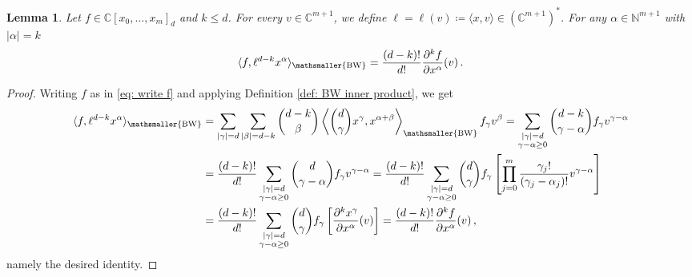 \documentclass[11pt,reqno]{amsart}
\numberwithin{equation}{section}
\theoremstyle{plain}
\numberwithin{theorem}{section}
\newtheorem{lemma}[theorem]{Lemma}
\theoremstyle{definition}
\newcommand{\N}{\mathbb{N}}
\newcommand{\C}{\mathbb{C}}
\newcommand{\mBW}{\mathsmaller{\mathrm{BW}}}
\begin{document}
\begin{lemma}\label{lem: identity BW inner product partial derivatives}
Let $f\in\C[x_0,\dots,x_m]_d$ and $k\le d$. For every $v\in\C^{m+1}$, we define $\ell=\ell(v)\coloneqq\langle x,v\rangle\in(\C^{m+1})^*$. For any $\alpha\in\N^{m+1}$ with $|\alpha|=k$
\[
\langle f,\ell^{d-k}x^\alpha\rangle_\mBW = \frac{(d-k)!}{d!}\frac{\partial^k f}{\partial x^\alpha}(v)\,.
\]
\end{lemma}
\begin{proof}
Writing $f$ as in \eqref{eq: write f} and applying Definition \ref{def: BW inner product}, we get
\begin{align*}
    \langle f,\ell^{d-k}x^\alpha\rangle_\mBW &= \sum_{|\gamma|=d}\sum_{|\beta|=d-k}\binom{d-k}{\beta}\left\langle\binom{d}{\gamma}x^\gamma,x^{\alpha+\beta}\right\rangle_\mBW f_\gamma v^\beta = \sum_{\substack{|\gamma|=d\\\gamma-\alpha\ge 0}}\binom{d-k}{\gamma-\alpha}f_\gamma v^{\gamma-\alpha}\\
    &= \frac{(d-k)!}{d!}\sum_{\substack{|\gamma|=d\\\gamma-\alpha\ge 0}}\binom{d}{\gamma-\alpha}f_\gamma v^{\gamma-\alpha} = \frac{(d-k)!}{d!}\sum_{\substack{|\gamma|=d\\\gamma-\alpha\ge 0}}\binom{d}{\gamma}f_\gamma\left[\prod_{j=0}^m\frac{\gamma_j!}{(\gamma_j-\alpha_j)!}v^{\gamma-\alpha}\right]\\
    &= \frac{(d-k)!}{d!}\sum_{\substack{|\gamma|=d\\\gamma-\alpha\ge 0}}\binom{d}{\gamma}f_\gamma\left[\frac{\partial^k x^\gamma}{\partial x^\alpha}(v)\right] = \frac{(d-k)!}{d!}\frac{\partial^k f}{\partial x^\alpha}(v)\,,
\end{align*}
namely the desired identity.
\end{proof}
\end{document}
